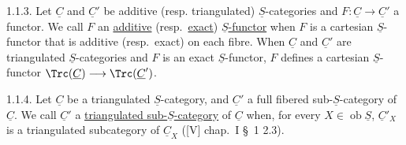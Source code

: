 1.1.3. Let \(\underline{C}\) and \(\underline{C}'\) be additive (resp. triangulated) \(\underline{S}\)-categories and \(F:\underline{C}\to\underline{C}'\) a functor. We call \(F\) an \uline{additive} (resp.\ \uline{exact}) \(\underline{S}\)\uline{-functor} when \(F\) is a cartesian \(\underline{S}\)-functor that is additive (resp.\ exact) on each fibre.
\providecommand{\cC}{\mathcal C}
\providecommand{\cD}{\mathcal D}
\providecommand{\cK}{\mathcal K}
\providecommand{\cO}{\mathcal O}
\providecommand{\cS}{\mathcal S}
\providecommand{\Cpx}{\mathrm C}
\providecommand{\Kpx}{\mathrm K}
\providecommand{\Dpx}{\mathrm D}
\providecommand{\D}{\mathrm D}
\providecommand{\Ho}{\mathrm H}
\providecommand{\RHom}{\mathrm R\!\operatorname{Hom}}
\providecommand{\Ob}{\operatorname{ob}}
\providecommand{\Coker}{\operatorname{Coker}}
\providecommand{\Ker}{\operatorname{Ker}}
\renewcommand{\Im}{\operatorname{Im}}
\providecommand{\Hom}{\operatorname{Hom}}
\providecommand{\Cone}{\operatorname{Cone}}
\providecommand{\id}{\operatorname{Id}}
\providecommand{\qis}{\xrightarrow{\sim}}
%
When \(\underline{C}\) and \(\underline{C}'\) are triangulated \(\underline{S}\)-categories and \(F\) is an exact \(\underline{S}\)-functor, \(F\) defines a cartesian \(\underline{S}\)-functor \(\Trc(\underline{C})\longrightarrow \Trc(\underline{C}')\).

1.1.4. Let \(\underline{C}\) be a triangulated \(\underline{S}\)-category, and \(\underline{C}'\) a full fibered sub-\(\underline{S}\)-category of \(\underline{C}\). We call \(\underline{C}'\) a \uline{triangulated sub-}\(\underline{S}\)\uline{-category} of \(\underline{C}\) when, for every \(X\in\Ob \underline{S}\), \(\underline{C}'_X\) is a triangulated subcategory of \(\underline{C}_X\) ([V] chap.\ I \S~1 2.3).

